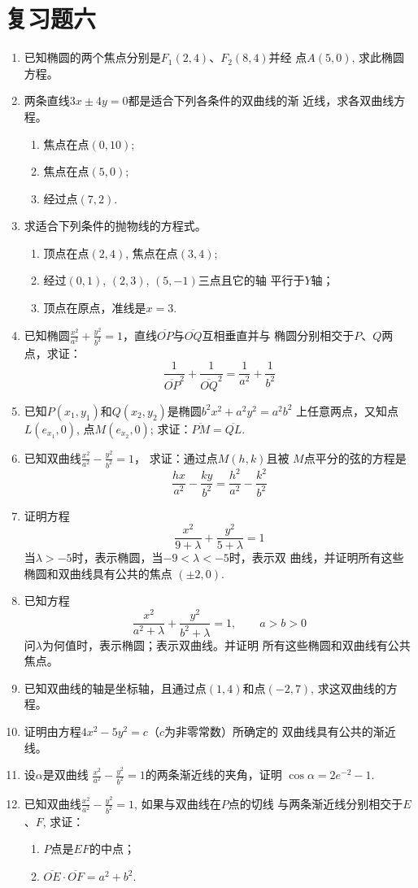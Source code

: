 \section*{复习题六}
\begin{enumerate}
    \item 已知椭圆的两个焦点分别是$F_1(2,4)$、$F_2(8,4)$并经
    点$A(5,0)$, 求此椭圆方程。
    \item 两条直线$3x\pm 4y=0$都是适合下列各条件的双曲线的渐
    近线，求各双曲线方程。
\begin{enumerate}
\item 焦点在点$(0,10)$;
\item 焦点在点$(5,0)$;
\item 经过点$(7,2)$.
\end{enumerate}

    \item 求适合下列条件的抛物线的方程式。
\begin{enumerate}
    \item 顶点在点$(2,4)$, 焦点在点$(3,4)$;
    \item 经过$(0,1)$, $(2,3)$, $(5,-1)$三点且它的轴
    平行于$Y$轴；
\item     顶点在原点，准线是$x=3$.
\end{enumerate}

\item    已知椭圆$\frac{x^2}{a^2}+\frac{y^2}{b^2}=1$，直线$\overline{OP}$与$\overline{OQ}$互相垂直并与
椭圆分别相交于$P$、$Q$两点，求证：
\[\frac{1}{\overline{OP}^2}+\frac{1}{\overline{OQ}^2}=\frac{1}{a^2}+\frac{1}{b^2}\]
\item    已知$P(x_1,y_1)$和$Q(x_2,y_2)$是椭圆$b^2x^2+a^2y^2=a^2b^2$
上任意两点，又知点$L(e_{x_1},0)$, 点$M(e_{x_2},0)$; 
求证：$\overline{PM}=\overline{QL}$.
\item    已知双曲线$\frac{x^2}{a^2}-\frac{y^2}{b^2}=1$，
求证：通过点$M(h,k)$且被
$M$点平分的弦的方程是
\[\frac{hx}{a^2}-\frac{ky}{b^2}=\frac{h^2}{a^2}-\frac{k^2}{b^2}\]
\item    证明方程
\[\frac{x^2}{9+\lambda}+\frac{y^2}{5+\lambda}=1\]
当$\lambda>-5$时，表示椭圆，当$-9<\lambda<-5$时，表示双
曲线，并证明所有这些椭圆和双曲线具有公共的焦点
$(\pm 2,0)$.
\item    已知方程
\[\frac{x^2}{a^2+\lambda}+\frac{y^2}{b^2+\lambda}=1,\qquad  a>b>0\]
问$\lambda$为何值时，表示椭圆；表示双曲线。并证明
所有这些椭圆和双曲线有公共焦点。

\item 已知双曲线的轴是坐标轴，且通过点$(1,4)$和点$(-2,
7)$, 求这双曲线的方程。
\item 证明由方程$4x^2-5y^2=c$（$c$为非零常数）所确定的
双曲线具有公共的渐近线。
\item 设$\alpha$是双曲线
$\frac{x^2}{a^2}-\frac{y^2}{b^2}=1$的两条渐近线的夹角，证明
$\cos\alpha=2e^{-2}-1$.
\item 已知双曲线$\frac{x^2}{a^2}-\frac{y^2}{b^2}=1$, 如果与双曲线在$P$点的切线
与两条渐近线分别相交于$E$、$F$, 求证：
\begin{enumerate}
    \item $P$点是$EF$的中点；
    \item $\overline{OE}\cdot \overline{OF}=a^2+b^2$.
\end{enumerate}


\end{enumerate}
